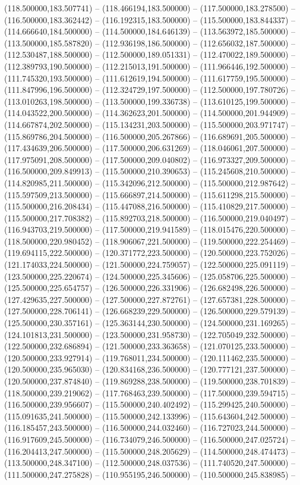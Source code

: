 (118.500000,183.507741) -- (118.466194,183.500000) -- (117.500000,183.278500) -- (116.500000,183.362442) -- (116.192315,183.500000) -- (115.500000,183.844337) -- (114.666640,184.500000) -- (114.500000,184.646139) -- (113.563972,185.500000) -- (113.500000,185.587820) -- (112.936198,186.500000) -- (112.656032,187.500000) -- (112.530487,188.500000) -- (112.500000,189.051331) -- (112.470022,189.500000) -- (112.389793,190.500000) -- (112.215013,191.500000) -- (111.966446,192.500000) -- (111.745320,193.500000) -- (111.612619,194.500000) -- (111.617759,195.500000) -- (111.847996,196.500000) -- (112.324729,197.500000) -- (112.500000,197.780726) -- (113.010263,198.500000) -- (113.500000,199.336738) -- (113.610125,199.500000) -- (114.043522,200.500000) -- (114.362623,201.500000) -- (114.500000,201.944909) -- (114.667874,202.500000) -- (115.134231,203.500000) -- (115.500000,203.971747) -- (115.869786,204.500000) -- (116.500000,205.267866) -- (116.689691,205.500000) -- (117.434639,206.500000) -- (117.500000,206.631269) -- (118.046061,207.500000) -- (117.975091,208.500000) -- (117.500000,209.040802) -- (116.973327,209.500000) -- (116.500000,209.849913) -- (115.500000,210.390653) -- (115.245608,210.500000) -- (114.820985,211.500000) -- (115.342096,212.500000) -- (115.500000,212.987642) -- (115.597509,213.500000) -- (115.666897,214.500000) -- (115.611298,215.500000) -- (115.500000,216.208434) -- (115.447088,216.500000) -- (115.410829,217.500000) -- (115.500000,217.708382) -- (115.892703,218.500000) -- (116.500000,219.040497) -- (116.943703,219.500000) -- (117.500000,219.941589) -- (118.015476,220.500000) -- (118.500000,220.980452) -- (118.906067,221.500000) -- (119.500000,222.254469) -- (119.694115,222.500000) -- (120.371772,223.500000) -- (120.500000,223.752026) -- (121.174033,224.500000) -- (121.500000,224.759057) -- (122.500000,225.091119) -- (123.500000,225.220674) -- (124.500000,225.345606) -- (125.058706,225.500000) -- (125.500000,225.654757) -- (126.500000,226.331906) -- (126.682498,226.500000) -- (127.429635,227.500000) -- (127.500000,227.872761) -- (127.657381,228.500000) -- (127.500000,228.706141) -- (126.668239,229.500000) -- (126.500000,229.579139) -- (125.500000,230.357161) -- (125.363144,230.500000) -- (124.500000,231.169265) -- (124.101813,231.500000) -- (123.500000,231.958730) -- (122.705049,232.500000) -- (122.500000,232.686894) -- (121.500000,233.363658) -- (121.070125,233.500000) -- (120.500000,233.927914) -- (119.768011,234.500000) -- (120.111462,235.500000) -- (120.500000,235.965030) -- (120.834168,236.500000) -- (120.777121,237.500000) -- (120.500000,237.874840) -- (119.869288,238.500000) -- (119.500000,238.701839) -- (118.500000,239.219062) -- (117.768463,239.500000) -- (117.500000,239.594715) -- (116.500000,239.956607) -- (115.500000,240.402492) -- (115.299425,240.500000) -- (115.091635,241.500000) -- (115.500000,242.133996) -- (115.643604,242.500000) -- (116.185457,243.500000) -- (116.500000,244.032460) -- (116.727023,244.500000) -- (116.917609,245.500000) -- (116.734079,246.500000) -- (116.500000,247.025724) -- (116.204413,247.500000) -- (115.500000,248.205629) -- (114.500000,248.474473) -- (113.500000,248.347100) -- (112.500000,248.037536) -- (111.740520,247.500000) -- (111.500000,247.275828) -- (110.955195,246.500000) -- (110.500000,245.838985) -- 